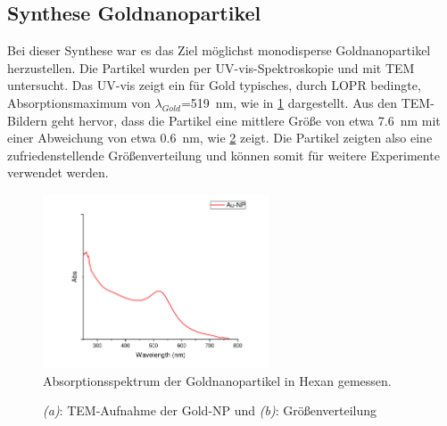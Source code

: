 \subsection{Synthese Goldnanopartikel}
	Bei dieser Synthese war es das Ziel möglichst monodisperse Goldnanopartikel herzustellen.
	Die Partikel wurden per UV-vis-Spektroskopie und mit TEM untersucht.
	Das UV-vis zeigt ein für Gold typisches, durch LOPR bedingte, Absorptionsmaximum von $\lambda_{Gold}$=\SI{519}{\nano\meter}, wie in \cref{fig:UV-AuNP} dargestellt.
	Aus den TEM-Bildern geht hervor, dass die Partikel eine mittlere Größe von etwa \SI{7,6}{\nano\meter} mit einer Abweichung von etwa \SI{0,6}{\nano\meter}, wie \cref{fig:TEM-Au-Hex-2} zeigt.	
	Die Partikel zeigten also eine zufriedenstellende Größenverteilung und können somit für weitere Experimente verwendet werden.
	
	\begin{figure}[H]
		\centering
		\includegraphics[width=0.6\textwidth]{Bilder/Gold-NP-Organisch} 	
		\caption{Absorptionsspektrum der Goldnanopartikel in Hexan gemessen.}
		\label{fig:UV-AuNP}
	\end{figure}
	
	\begin{figure}[htbp]
		\centering
		\caption{\emph{(a)}: TEM-Aufnahme der Gold-NP und \emph{(b)}: Größenverteilung}
		\label{fig:TEM-Au-Hex-2}
	\end{figure}


